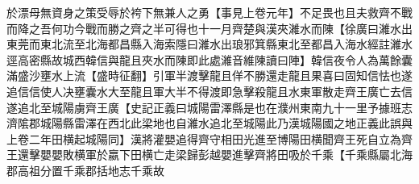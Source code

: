 於漂母無資身之策受辱於袴下無兼人之勇【事見上卷元年】不足畏也且夫救齊不戰而降之吾何功今戰而勝之齊之半可得也十一月齊楚與漢夾濰水而陳【徐廣曰濰水出東莞而東北流至北海都昌縣入海索隱曰濰水出琅邪箕縣東北至都昌入海水經註濰水逕高密縣故城西韓信與龍且夾水而陳即此處濰音維陳讀曰陣】韓信夜令人為萬餘囊滿盛沙壅水上流【盛時征翻】引軍半渡擊龍且佯不勝還走龍且果喜曰固知信怯也遂追信信使人决壅囊水大至龍且軍大半不得渡即急擊殺龍且水東軍散走齊王廣亡去信遂追北至城陽虜齊王廣【史記正義曰城陽雷澤縣是也在濮州東南九十一里予據班志濟隂郡城陽縣雷澤在西北此梁地也自濰水追北至城陽此乃漢城陽國之地正義此誤與上卷二年田横起城陽同】漢將灌嬰追得齊守相田光進至博陽田横聞齊王死自立為齊王還擊嬰嬰敗横軍於嬴下田横亡走梁歸彭越嬰進擊齊將田吸於千乘【千乘縣屬北海郡高祖分置千乘郡括地志千乘故